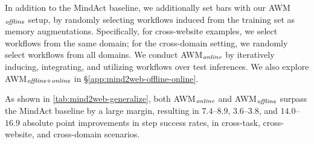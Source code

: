 In addition to the MindAct baseline, we additionally set bars with our \textsc{AWM$_{\it offline}$} setup, by randomly selecting workflows induced from the training set as memory augmentations. Specifically, for cross-website examples, we select workflows from the same domain; for the cross-domain setting, we randomly select workflows from all domains.
We conduct \textsc{AWM$_{\it online}$} by iteratively inducing, integrating, and utilizing workflows over test inferences. We also explore \textsc{AWM}$_{\it offline+online}$ in \S\ref{app:mind2web-offline-online}.

As shown in \autoref{tab:mind2web-generalize}, both \textsc{AWM$_{\it online}$} and \textsc{AWM$_{\it offline}$} surpass the MindAct baseline by a large margin, resulting in $7.4$--$8.9$, $3.6$--$3.8$, and $14.0$--$16.9$ absolute point improvements in step success rates, in cross-task, cross-website, and cross-domain scenarios.


\begin{table}[t!]
\vspace{-4mm}
\small
\centering
\caption{Success rate on Mind2Web cross-task, cross-website, and cross-domain generalization test, using \texttt{gpt-4} model. EA is short for element accuracy and AF$_1$ is short for action F$_1$.}
\vspace{1mm}
\label{tab:mind2web-generalize}
\vspace{-4mm}
\end{table}

